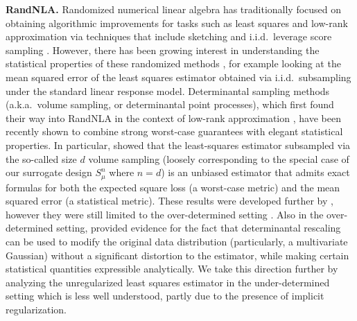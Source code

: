 \documentclass[11pt]{article}
\begin{document}
\textbf{RandNLA.}
Randomized numerical linear algebra
\citep{DM16_CACM,RandNLA_PCMIchapter_TR} has
traditionally focused on obtaining algorithmic improvements for tasks
such as least squares and low-rank approximation via techniques that include
sketching \citep{sarlos-sketching} and i.i.d.~leverage score sampling
\citep{Drineas2006sampling}. However, there has been growing
interest in understanding the statistical properties of these
randomized methods \citep{MMY15,GarveshMahoney_JMLR}, for example
looking at the mean squared error of the least squares estimator
obtained via i.i.d.~subsampling under the standard linear response
model. Determinantal sampling methods (a.k.a.~volume sampling, or
determinantal point processes), which first found their way
into RandNLA in the context of low-rank approximation
\cite[][]{pca-volume-sampling}, have been recently shown to combine
strong worst-case guarantees with elegant statistical properties.
In particular, \cite{unbiased-estimates} showed that the
least-squares estimator subsampled via the so-called size $d$ volume
sampling (loosely corresponding to the special case of our surrogate design
$S_\mu^n$ where $n=d$) is an unbiased estimator that admits exact
formulas for both the expected square loss (a worst-case metric)
and the mean squared error (a statistical metric). These results were
developed further by
\cite{leveraged-volume-sampling,correcting-bias,minimax-experimental-design},
however they were still limited to the over-determined setting 
\cite[with the exception
of][who gave upper bounds on the mean squared error of the ridge estimator
under different determinantal
samplings]{regularized-volume-sampling,bayesian-experimental-design}.
Also in the over-determined setting, 
\cite{correcting-bias-journal} provided evidence for the fact that
determinantal rescaling can be used to modify the original data
distribution (particularly, a multivariate Gaussian) without a
significant distortion to the estimator, while making certain
statistical quantities expressible analytically. We take this
direction further by analyzing the unregularized least squares
estimator in the under-determined setting which is less well
understood, partly due to the presence of implicit regularization.
\end{document}
